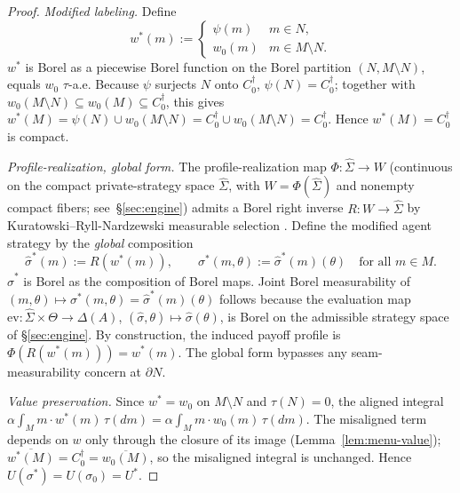 \documentclass[11pt]{article}
\theoremstyle{definition}
\theoremstyle{remark}
\begin{document}
\begin{proof}
\emph{Modified labeling.} Define
\[
  w^*(m) :=
  \begin{cases}
    \psi(m) & m \in N,\\
    w_0(m) & m \in M \setminus N.
  \end{cases}
\]
$w^*$ is Borel as a piecewise Borel function on the Borel partition
$(N, M \setminus N)$, equals $w_0$ $\tau$-a.e. Because $\psi$
surjects $N$ onto $C^\dagger_0$, $\psi(N) = C^\dagger_0$; together with
$w_0(M \setminus N) \subseteq w_0(M) \subseteq C^\dagger_0$, this gives
$w^*(M) = \psi(N) \cup w_0(M \setminus N) = C^\dagger_0 \cup
w_0(M \setminus N) = C^\dagger_0$. Hence $w^*(M) = C^\dagger_0$ is
compact.

\emph{Profile-realization, global form.} The profile-realization map
$\Phi : \hat\Sigma \to W$ (continuous on the compact private-strategy
space $\hat\Sigma$, with $W = \Phi(\hat\Sigma)$ and nonempty compact
fibers; see~\S\ref{sec:engine}) admits a Borel right inverse
$R : W \to \hat\Sigma$ by Kuratowski--Ryll-Nardzewski measurable
selection \cite[Thm.~18.13]{AliprantisBorder2006}. Define the modified
agent strategy by the \emph{global} composition
\[
  \hat\sigma^*(m) := R(w^*(m)), \qquad
  \sigma^*(m, \theta) := \hat\sigma^*(m)(\theta) \quad \text{for all } m \in M.
\]
$\hat\sigma^*$ is Borel as the composition of Borel maps. Joint Borel
measurability of $(m,\theta) \mapsto \sigma^*(m,\theta) =
\hat\sigma^*(m)(\theta)$ follows because the evaluation map
$\mathrm{ev} : \hat\Sigma \times \Theta \to \Delta(A)$,
$(\hat\sigma, \theta) \mapsto \hat\sigma(\theta)$, is Borel on the
admissible strategy space of \S\ref{sec:engine}. By construction, the
induced payoff profile is $\Phi(R(w^*(m))) = w^*(m)$. The global form
bypasses any seam-measurability concern at $\partial N$.

\emph{Value preservation.} Since $w^* = w_0$ on $M \setminus N$ and
$\tau(N) = 0$, the aligned integral
$\alpha\!\int_M m \cdot w^*(m)\,\tau(dm) = \alpha\!\int_M m \cdot w_0(m)\,\tau(dm)$.
The misaligned term depends on $w$ only through the closure of its
image (Lemma~\ref{lem:menu-value}); $\overline{w^*(M)} = C^\dagger_0 =
\overline{w_0(M)}$, so the misaligned integral is unchanged. Hence
$U(\sigma^*) = U(\sigma_0) = U^*$.


\end{proof}
\end{document}
